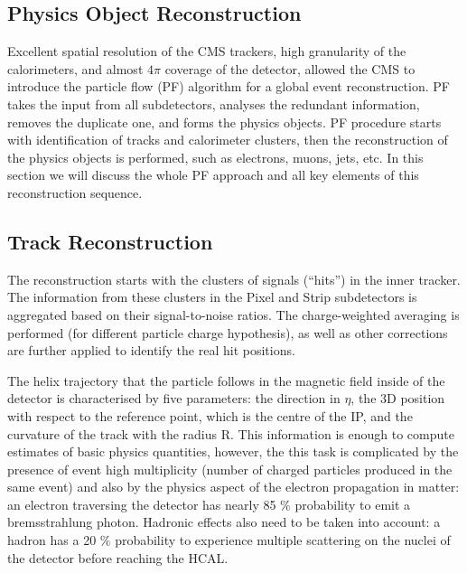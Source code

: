 
\begin{small}


\chapter{Physics Object Reconstruction}
\label{ch:cms_reco}

Excellent spatial resolution of the CMS trackers, high granularity of the calorimeters, and almost $4\pi$ coverage of the detector, allowed the CMS to introduce the particle flow (PF) algorithm \cite{Particle_flow} for a global event reconstruction. PF takes the input from all subdetectors, analyses the redundant information, removes the duplicate one, and forms the physics objects. PF procedure starts with identification of tracks and calorimeter clusters, then the reconstruction of the physics objects is performed, such as electrons, muons, jets, etc. In this section we will discuss the whole PF approach and all key elements of this reconstruction sequence.
  
  
\section{Track Reconstruction}\label{sec:track_reconstruction}

The reconstruction starts with the clusters of signals (``hits'') in the inner tracker. The information from these clusters in the Pixel and Strip subdetectors is aggregated based on their signal-to-noise ratios. The charge-weighted averaging is performed (for different particle charge hypothesis), as well as other corrections are further applied to identify the real hit positions. 

The helix trajectory that the particle follows in the magnetic field inside of the detector is characterised by five parameters: the direction in $\eta$, the 3D position with respect to the reference point, which is the centre of the IP, and the curvature of the track with the radius R. This information is enough to compute estimates of basic physics quantities, however, the this task is complicated by the presence of event high multiplicity (number of charged particles produced in the same event) and also by the physics aspect of the electron propagation in matter: an electron traversing the detector has nearly 85 $\%$ probability to emit a bremsstrahlung photon. Hadronic effects also need to be taken into account: a hadron has a 20 $\%$ probability to experience multiple scattering on the nuclei of the detector before reaching the HCAL. 


\end{small}
